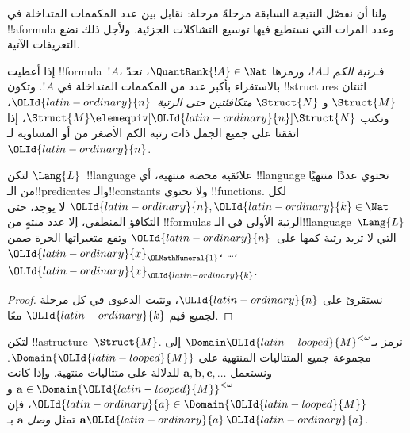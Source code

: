\documentclass[../../../include/open-logic-section]{subfiles}
\begin{document}
ولنا أن نفصّل النتيجة السابقة مرحلةً مرحلة: نقابل بين عدد
المكممات المتداخلة في !!a{formula} وعدد المرات التي نستطيع فيها
توسيع التشاكلات الجزئية. ولأجل ذلك نضع التعريفات الآتية.

\begin{defn}
  إذا أعطيت !!{formula}~$!A$، فـ\emph{رتبة الكم} لـ$!A$، ورمزها
  $\QuantRank{!A} \in \Nat$، تحدّ بالاستقراء بأكبر عدد من المكممات
  المتداخلة في $!A$. وتكون !!{structure}s اثنتان $\Struct{M}$ و
  $\Struct{N}$ \emph{متكافئتين حتى الرتبة~$\OLId{latin-ordinary}{n}$}، ونكتب
  $\Struct{M} \elemequiv[\OLId{latin-ordinary}{n}] \Struct{N}$، إذا اتفقتا على جميع الجمل ذات
  رتبة الكم الأصغر من أو المساوية لـ$\OLId{latin-ordinary}{n}$.
\end{defn}

\begin{prop}
  لتكن $\Lang{L}$~!!{language} علائقية محضة منتهية، أي !!{language}
  تحتوي عددًا منتهيًا من الـ!!{predicate}s والـ!!{constant}s ولا تحتوي
  !!{function}s. لكل $\OLId{latin-ordinary}{n},\OLId{latin-ordinary}{k} \in \Nat$ لا يوجد، حتى التكافؤ المنطقي، إلا
  عدد منتهٍ من !!{formula}s الرتبة الأولى في الـ!!{language}~$\Lang{L}$ التي لا تزيد
  رتبة كمها على~$\OLId{latin-ordinary}{n}$ وتقع متغيراتها الحرة ضمن $\OLId{latin-ordinary}{x}_\OLMathNumeral{1}$، \dots،~$\OLId{latin-ordinary}{x}_\OLId{latin-ordinary}{k}$.
\end{prop}

\begin{proof}
  نستقرئ على $\OLId{latin-ordinary}{n}$، ونثبت الدعوى في كل مرحلة لجميع قيم $\OLId{latin-ordinary}{k}$ معًا.
\end{proof}

\begin{defn}
  لتكن !!a{structure}~$\Struct{M}$. نرمز بـ$\Domain \OLId{latin-looped}{M}^{<\omega}$ إلى
  مجموعة جميع المتتاليات المنتهية على $\Domain{\OLId{latin-looped}{M}}$. ونستعمل
  $\mathbf{a}, \mathbf{b}, \mathbf{c}, \ldots$ للدلالة على متتاليات
  منتهية. وإذا كانت $\mathbf{a} \in \Domain{\OLId{latin-looped}{M}}^{<\omega}$ و
  $\OLId{latin-ordinary}{a} \in \Domain{\OLId{latin-looped}{M}}$، فإن $\mathbf{a}\OLId{latin-ordinary}{a}$ تمثل \emph{وصل}
  $\mathbf{a}$ بـ$\OLId{latin-ordinary}{a}$.
\end{defn}
\end{document}
